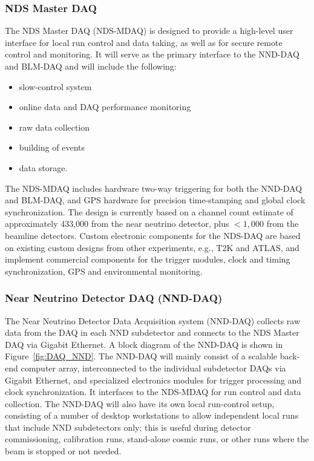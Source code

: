 \subsubsection{NDS Master DAQ} 
\label{cdrsec:nd-master-daq}

The NDS Master DAQ (NDS-MDAQ) is designed to provide a high-level user interface 
for local run control and data taking, as well as for secure remote control and monitoring.   It will 
serve as the primary interface to the NND-DAQ and BLM-DAQ and will include the following:
\begin{itemize}
\item slow-control system 
\item online data and DAQ performance monitoring  
\item raw data collection
\item building of events
\item data storage.   
\end{itemize}
The NDS-MDAQ includes hardware two-way triggering for both the NND-DAQ and BLM-DAQ, and 
GPS hardware for precision time-stamping and global clock synchronization. 
The design is currently based on a channel count estimate of approximately 433,000 
from the near neutrino detector, plus $<1,000$ 
from the beamline detectors.  Custom electronic components for the NDS-DAQ are based on existing 
custom designs from other experiments, e.g., T2K and ATLAS, and 
implement commercial components for the trigger modules, clock and timing synchronization, 
GPS and environmental monitoring.


\subsubsection{Near Neutrino Detector DAQ (NND-DAQ)} 
\label{cdrsec:nd:nnd:daq}


The Near Neutrino Detector Data Acquisition system (NND-DAQ) collects raw data from 
the DAQ in each NND subdetector and connects to the 
NDS Master DAQ via Gigabit Ethernet. A block diagram of the NND-DAQ is
shown in Figure~\ref{fig:DAQ_NND}. The NND-DAQ will mainly consist 
of a scalable back-end computer array, interconnected to the individual 
subdetector DAQs via Gigabit Ethernet, and specialized electronics modules for trigger 
processing and clock synchronization. It interfaces to the NDS-MDAQ for 
run control and data collection. The NND-DAQ will also have its own local run-control setup, 
consisting of a number of desktop workstations to allow independent local runs that include 
NND subdetectors only; this is useful during detector commissioning, calibration runs, 
stand-alone cosmic runs, or other runs where the beam is stopped or not needed.

